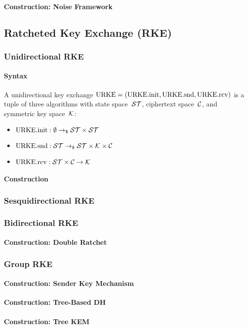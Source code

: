\documentclass[a4paper,orivec]{llncs}
\begin{document}
\paragraph{Construction: Noise Framework}


\subsection{Ratcheted Key Exchange (RKE)}

\subsubsection{Unidirectional RKE}

\paragraph{Syntax}
A unidirectional key exchange $\mathrm{URKE}=(\mathrm{URKE}.\mathrm{init},\mathrm{URKE}.\mathrm{snd},\mathrm{URKE}.\mathrm{rcv})$ is a tuple of three algorithms with state space~$\mathcal{ST}$, ciphertext space~$\mathcal{C}$, and symmetric key space~$\mathcal{K}$:

\begin{itemize}
    \item $\mathrm{URKE}.\mathrm{init}: \emptyset \to_\$ \mathcal{ST}\times\mathcal{ST}$
    \item $\mathrm{URKE}.\mathrm{snd}: \mathcal{ST} \to_\$ \mathcal{ST}\times\mathcal{K}\times\mathcal{C}$
    \item $\mathrm{URKE}.\mathrm{rcv}: \mathcal{ST}\times\mathcal{C} \to \mathcal{K}$
\end{itemize}

\paragraph{Construction}

\subsubsection{Sesquidirectional RKE}

\subsubsection{Bidirectional RKE}

\paragraph{Construction: Double Ratchet}

\subsubsection{Group RKE}

\paragraph{Construction: Sender Key Mechanism}

\paragraph{Construction: Tree-Based DH}

\paragraph{Construction: Tree KEM}


\end{document}
